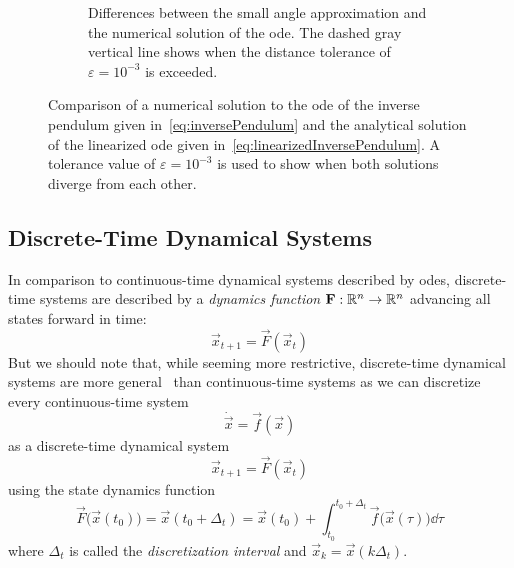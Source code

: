 \begin{figure}
\begin{subfigure}[t]{0.5\linewidth}
				\caption[Difference between the small angle approximate solution of the inverse pendulum and a numerical solution]{Differences between the small angle approximation and the numerical solution of the \ac{ode}. The dashed gray vertical line shows when the distance tolerance of \( \varepsilon = 10^{-3} \) is exceeded.}
			\end{subfigure}
			\caption[Comparison of the small angle approximate solution of the inverse pendulum an a numerical solution]{Comparison of a numerical solution to the \ac{ode} of the inverse pendulum given in~\eqref{eq:inversePendulum} and the analytical solution of the linearized \ac{ode} given in~\eqref{eq:linearizedInversePendulum}. A tolerance value of \( \varepsilon = 10^{-3} \) is used to show when both solutions diverge from each other.}
			\label{fig:inversePendulumApprox}
		\end{figure}

	\subsection{Discrete-Time Dynamical Systems}
		In comparison to continuous-time dynamical systems described by \acp{ode}, discrete-time systems are described by a \emph{dynamics function} \( \boldsymbol{\mathrm{F}} : \mathbb{R}^n \to \mathbb{R}^n \) advancing all states forward in time:
		\begin{equation*}
			\vec{x}_{t + 1} = \vec{F}(\vec{x}_t)
		\end{equation*}
		But we should note that, while seeming more restrictive, discrete-time dynamical systems are more general~\cite{bruntonKoopmanInvariantSubspaces2016} than continuous-time systems as we can discretize every continuous-time system
		\begin{equation*}
			\dot{\vec{x}} = \vec{f}(\vec{x})
		\end{equation*}
		as a discrete-time dynamical system
		\begin{equation*}
			\vec{x}_{t + 1} = \vec{F}(\vec{x}_t)
		\end{equation*}
		using the state dynamics function
		\begin{equation*}
			\vec{F}\big(\vec{x}(t_0)\big) = \vec{x}(t_0 + \Delta_t) = \vec{x}(t_0) + \int_{t_0}^{t_0 + \Delta_t} \! \vec{f}\big(\vec{x}(\tau)\big) \dd{\tau}
		\end{equation*}
		where \( \Delta_t \) is called the \emph{discretization interval} and \( \vec{x}_k = \vec{x}(k \Delta_t) \).

